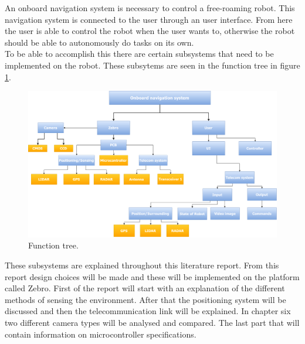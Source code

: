 \documentclass{article}
\begin{document}
An onboard navigation system is necessary to control a free-roaming robot. This navigation system is connected to the user through an user interface. From here the user is able to control the robot when the user wants to, otherwise the robot should be able to autonomously do tasks on its own.\\
To be able to accomplish this there are certain subsystems that need to be implemented on the robot. These subsytems are seen in the function tree in figure \ref{intro1}.

\begin{figure}[H]
	\centering
	\includegraphics[scale=0.3]{figures/functiontree}
	\caption{Function tree.}
	\label{intro1}
\end{figure}

These subsystems are explained throughout this literature report. From this report design choices will be made and these will be implemented on the platform called Zebro. First of the report will start with an explanation of the different methods of sensing the environment. After that the positioning system will be discussed and then the telecommunication link will be explained. In chapter six two different camera types will be analysed and compared. The last part that will contain information on microcontroller specifications.
\end{document}
